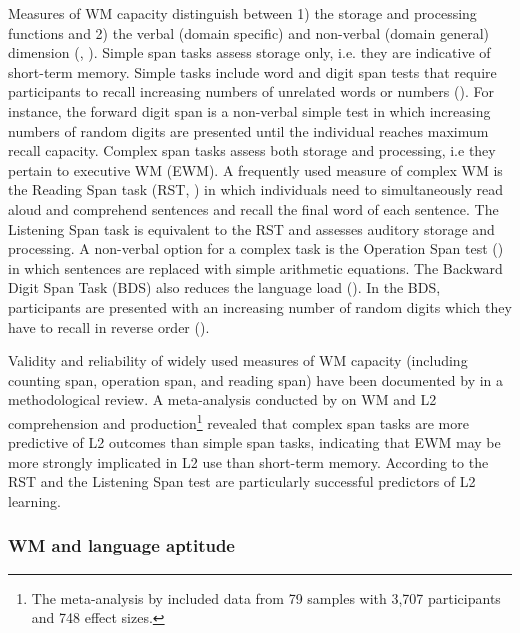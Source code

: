 \documentclass[output=paper]{langscibook}
\begin{document}
Measures of WM capacity distinguish between 1) the storage and processing functions and 2) the verbal (domain specific) and non-verbal (domain general) dimension (\citealt{LinckEtAl2014}, \citealt{Wen2015}). Simple span tasks assess storage only, i.e. they are indicative of short-term memory. Simple tasks include word and digit span tests that require participants to recall increasing numbers of unrelated words or numbers (\citealt{JuffsHarrington2011}). For instance, the forward digit span is a non-verbal simple test in which increasing numbers of random digits are presented until the individual reaches maximum recall capacity. Complex span tasks assess both storage and processing, i.e they pertain to executive WM (EWM). A frequently used measure of complex WM is the Reading Span task (RST, \citealt{DanemanCarpenter1980}) in which individuals need to simultaneously read aloud and comprehend sentences and recall the final word of each sentence. The Listening Span task is equivalent to the RST and assesses auditory storage and processing. A non-verbal option for a complex task is the Operation Span test (\citealt{TurnerEngle1989}) in which sentences are replaced with simple arithmetic equations. The Backward Digit Span Task (BDS) also reduces the language load (\citealt{KormosSafar2008}). In the BDS, participants are presented with an increasing number of random digits which they have to recall in reverse order (\citealt{JuffsHarrington2011}). 

Validity and reliability of widely used measures of WM capacity (including counting span, operation span, and reading span) have been documented by \citet{ConwayEtAl2005} in a methodological review. A meta-analysis conducted by \citet[861]{LinckEtAl2014} on WM and L2 comprehension and production\footnote{The meta-analysis by \citet{LinckEtAl2014} included data from 79 samples with 3,707 participants and 748 effect sizes.} revealed that complex span tasks are more predictive of L2 outcomes than simple span tasks, indicating that EWM may be more strongly implicated in L2 use than short-term memory. According to \citet[158]{JuffsHarrington2011} the RST and the Listening Span test are particularly successful predictors of L2 learning.

\subsubsection{WM and language aptitude} %
\end{document}
